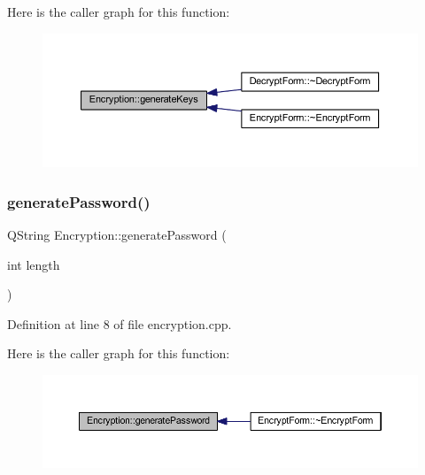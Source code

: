 Here is the caller graph for this function\+:\nopagebreak
\begin{figure}[H]
\begin{center}
\leavevmode
\includegraphics[width=350pt]{class_encryption_a737b60a95e826d7a99a3a3f62c9889d2_icgraph}
\end{center}
\end{figure}
\hypertarget{class_encryption_a4e2cab5c9d5349f085d40c8373b1985b}{}\label{class_encryption_a4e2cab5c9d5349f085d40c8373b1985b} 
\subsubsection{\texorpdfstring{generate\+Password()}{generatePassword()}}
{\footnotesize\ttfamily Q\+String Encryption\+::generate\+Password (\begin{DoxyParamCaption}\item[{int}]{length }\end{DoxyParamCaption})}



Definition at line 8 of file encryption.\+cpp.

Here is the caller graph for this function\+:\nopagebreak
\begin{figure}[H]
\begin{center}
\leavevmode
\includegraphics[width=350pt]{class_encryption_a4e2cab5c9d5349f085d40c8373b1985b_icgraph}
\end{center}
\end{figure}
\hypertarget{class_encryption_a55e34ee5668779c478f5771d24c2b183}{}\label{class_encryption_a55e34ee5668779c478f5771d24c2b183} 
